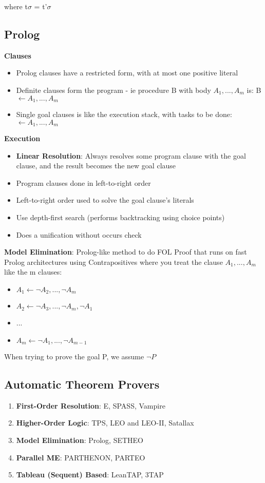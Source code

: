\documentclass{article}
\begin{document}
where t$\sigma$ = t'$\sigma$

\subsection{Prolog}
\textbf{Clauses}
\begin{itemize}
    \item Prolog clauses have a restricted form, with at most one positive literal
    \item Definite clauses form the program - ie procedure B with body $A_{1}, ..., A_{m}$ is: B $\leftarrow A_{1}, ..., A_{m}$
    \item Single goal clauses is like the execution stack, with tasks to be done: $\leftarrow A_{1}, ..., A_{m}$
\end{itemize}

\bigskip
\noindent
\textbf{Execution}
\begin{itemize}
    \item \textbf{Linear Resolution}: Always resolves some program clause with the goal clause, and the result becomes the new goal clause
    \item Program clauses done in left-to-right order
    \item Left-to-right order used to solve the goal clause's literals
    \item Use depth-first search (performs backtracking using choice points)
    \item Does a unification without occurs check
\end{itemize}

\bigskip
\noindent
\textbf{Model Elimination}: Prolog-like method to do FOL Proof that runs on fast Prolog architectures using Contrapositives where you treat the clause {$A_{1}, ..., A_{m}$} like the m clauses:
\begin{itemize}
    \item $A_{1} \leftarrow \neg A_{2}, ..., \neg A_{m}$
    \item $A_{2} \leftarrow \neg A_{3}, ..., \neg A_{m}, \neg A_{1}$
    \item ...
    \item $A_{m} \leftarrow \neg A_{1}, ..., \neg A_{m-1}$
\end{itemize}
When trying to prove the goal P, we assume $\neg P$

\subsection{Automatic Theorem Provers}
\begin{enumerate}
    \item \textbf{First-Order Resolution}: E, SPASS, Vampire
    \item \textbf{Higher-Order Logic}: TPS, LEO and LEO-II, Satallax
    \item \textbf{Model Elimination}: Prolog, SETHEO
    \item \textbf{Parallel ME}: PARTHENON, PARTEO
    \item \textbf{Tableau (Sequent) Based}: LeanTAP, 3TAP
\end{enumerate}
\end{document}

